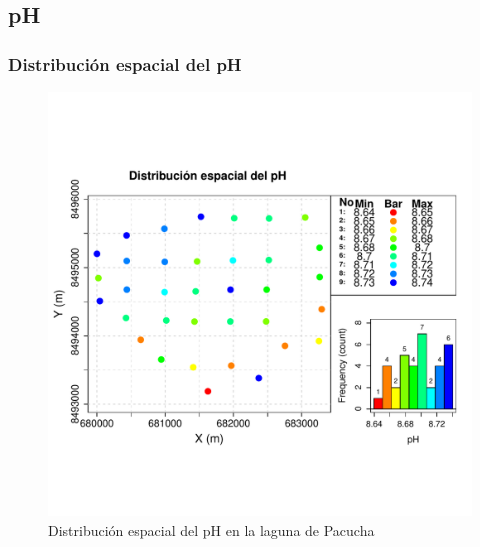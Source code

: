 \subsection{pH}
\subsubsection{Distribución espacial del pH}
\begin{figure}[!htb]
    \centering
    \includegraphics[width=0.8\linewidth]{Figuras_AED//PH/tem_Spatial_Distr.pdf}
    \caption{Distribución espacial del pH en la laguna de Pacucha}
    \label{fig:enter-labeldis}
\end{figure}

